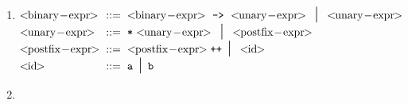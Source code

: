 \documentclass[11pt]{article}
\begin{document}
\begin{enumerate}
\begin{enumerate}
            \item \newcommand{\binaryexpr}{\ensuremath{<\!\!
                                          \mathrm{binary\!-\!expr} \!\!>}}
                  \newcommand{\unaryexpr}{\ensuremath{<\!\!
                                          \mathrm{unary\!-\!expr} \!\!>}}
                  \newcommand{\postfixexpr}{\ensuremath{<\!\!
                                            \mathrm{postfix\!-\!expr} \!\!>}}
                  \newcommand{\id}{\ensuremath{<\!\! \mathrm{id} \!\!>}}

                  \(
                    \renewcommand{\arraystretch}{1.25}
                    \begin{array}[t]{@{}l@{\hspace{2mm}}l@{\hspace{2mm}}l}
                      \binaryexpr
                        & ::=
                        & \binaryexpr \ \verb@->@ \
                          \unaryexpr \midspc \unaryexpr
                          \\
                      \unaryexpr
                        & ::=
                        & \verb@*@ \unaryexpr \midspc \postfixexpr
                        \\
                      \postfixexpr
                        & ::=
                        & \postfixexpr\verb@++@ \midspc \id
                        \\
                      \id
                        & ::=
                        & \mathtt{a \midspc b}
                        \\
                    \end{array}
                  \)

            \item \newcommand{\aplexpr}{\ensuremath{<\!\!
                                        \mathrm{apl\!-\!expr} \!\!>}}
                  \newcommand{\aploperand}{\ensuremath{<\!\!
                                           \mathrm{operand} \!\!>}}


\end{enumerate}
\end{enumerate}
\end{document}
